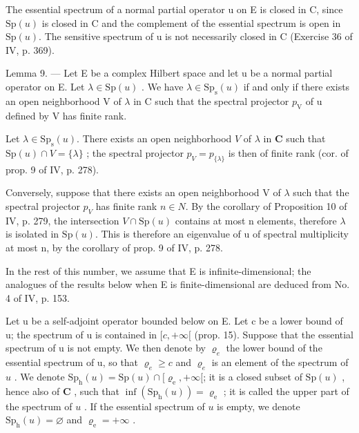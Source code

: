 The essential spectrum of a normal partial operator u on E is closed in C, since \(\mathrm{Sp}(u)\) is closed in C and the complement of the essential spectrum is open in \(\mathrm{Sp}(u)\). The sensitive spectrum of u is not necessarily closed in C (Exercise 36 of IV, p. 369).

Lemma 9. --- Let E be a complex Hilbert space and let u be a normal partial operator on E. Let \(\lambda \in \mathrm{Sp}(u)\) . We have \(\lambda \in \mathrm{Sp}_{\mathrm{s}}(u)\) if and only if there exists an open neighborhood V of \(\lambda\) in C such that the spectral projector \(p_{\mathrm{V}}\) of u defined by V has finite rank.

Let \(\lambda \in \mathrm{Sp}_{\mathrm{s}}(u)\). There exists an open neighborhood \(V\) of \(\lambda\) in \(\mathbf{C}\) such that \(\mathrm{Sp}(u) \cap V = \{\lambda\}\) ; the spectral projector \(p_V = p_{\{\lambda\}}\) is then of finite rank (cor. of prop. 9 of IV, p. 278).

Conversely, suppose that there exists an open neighborhood V of \(\lambda\) such that the spectral projector \(p_{V}\) has finite rank \(n \in N\). By the corollary of Proposition 10 of IV, p. 279, the intersection \(V \cap \mathrm{Sp}(u)\) contains at most n elements, therefore \(\lambda\) is isolated in \(\mathrm{Sp}(u)\). This is therefore an eigenvalue of u of spectral multiplicity at most n, by the corollary of prop. 9 of IV, p. 278.

In the rest of this number, we assume that E is infinite-dimensional; the analogues of the results below when E is finite-dimensional are deduced from No. 4 of IV, p. 153.

Let u be a self-adjoint operator bounded below on E. Let c be a lower bound of u; the spectrum of u is contained in \([c, +\infty[\) (prop. 15). Suppose that the essential spectrum of u is not empty. We then denote by \(\varrho_{e}\) the lower bound of the essential spectrum of u, so that \(\varrho_{e} \geqslant c\) and \(\varrho_{e}\) is an element of the spectrum of \(u\) . We denote \(\mathrm{Sp}_{\mathrm{h}}(u) = \mathrm{Sp}(u) \cap [\varrho_{\mathrm{e}}, +\infty[\); it is a closed subset of \(\mathrm{Sp}(u)\) , hence also of \(\mathbf{C}\) , such that \(\inf (\mathrm{Sp}_{\mathrm{h}}(u)) = \varrho_{\mathrm{e}}\) ; it is called the upper part of the spectrum of \(u\) . If the essential spectrum of \(u\) is empty, we denote \(\mathrm{Sp}_{\mathrm{h}}(u) = \varnothing\) and \(\varrho_{\mathrm{e}} = +\infty\) .

